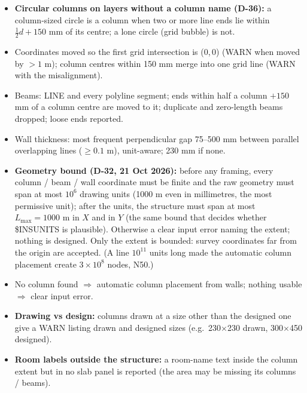\documentclass[10pt,a4paper]{article}
\begin{document}
\begin{itemize}
beam layers are not read (WARN); a NaN / infinite coordinate on a structural layer is an input error.
\item \textbf{Circular columns on layers without a column name (D-36):} a column-sized circle is a column when two or
more line ends lie within $\tfrac12 d+150$ mm of its centre; a lone circle (grid bubble) is not.
\item Coordinates moved so the first grid intersection is (0,\,0) (WARN when moved by $>1$ m); column centres within
150 mm merge into one grid line (WARN with the misalignment).
\item Beams: LINE and every polyline segment; ends within half a column $+150$ mm of a column centre are moved to it;
duplicate and zero-length beams dropped; loose ends reported.
\item Wall thickness: most frequent perpendicular gap 75--500 mm between parallel overlapping lines ($\ge0.1$ m),
unit-aware; 230 mm if none.
\item \textbf{Geometry bound (D-32, 21 Oct 2026):} before any framing, every column / beam / wall coordinate must be
finite and the raw geometry must span at most $10^6$ drawing units (1000 m even in millimetres, the most permissive
unit); after the units, the structure must span at most $L_\text{max}=1000$ m in $X$ and in $Y$ (the same bound that
decides whether \$INSUNITS is plausible). Otherwise a clear input error naming the extent; nothing is designed.
Only the extent is bounded: survey coordinates far from the origin are accepted. (A line $10^{11}$ units long made the
automatic column placement create $3\times10^8$ nodes, N50.)
\item No column found $\Rightarrow$ automatic column placement from walls; nothing usable $\Rightarrow$ clear input
error.
\item \textbf{Drawing vs design:} columns drawn at a size other than the designed one give a WARN listing drawn and
designed sizes (e.g.\ 230$\times$230 drawn, 300$\times$450 designed).
\item \textbf{Room labels outside the structure:} a room-name text inside the column extent but in no slab panel is
reported (the area may be missing its columns / beams).
\end{itemize}
\end{document}
